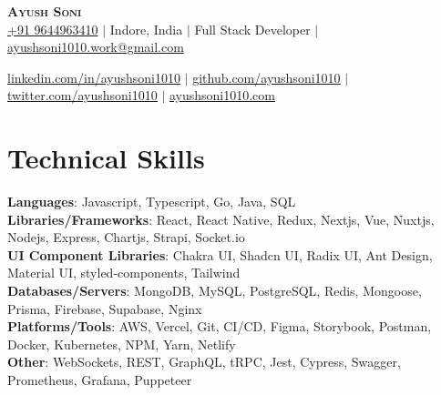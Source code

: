 \documentclass[letterpaper,11pt]{article}
\begin{document}

\begin{center}
  \textbf{\Huge \scshape Ayush Soni} \\ \vspace{10pt}
  \href{tel:9644963410}{+91 9644963410} $|$
  {Indore, India} $|$
  {Full Stack Developer} $|$
  \href{mailto:ayushsoni1010.work@gmail.com}{ayushsoni1010.work@gmail.com} \\ \vspace{3pt}

  \href{https://linkedin.com/in/ayushsoni1010}{\underline{linkedin.com/in/ayushsoni1010}} $|$
  \href{https://github.com/ayushsoni1010}{\underline{github.com/ayushsoni1010}} $|$
  \href{https://twitter.com/ayushsoni1010}{\underline{twitter.com/ayushsoni1010}} $|$
  \href{https://ayushsoni1010.com}{\underline{ayushsoni1010.com}}
\end{center}



\section{Technical Skills}
\begin{itemize}[leftmargin=0.15in, label={}]
  \small{\item{
        \textbf{Languages}{: \hfill Javascript, Typescript, Go, Java, SQL } \\
        \vspace{3pt}\textbf{Libraries/Frameworks}{: \hfill React, React Native, Redux, Nextjs, Vue, Nuxtjs, Nodejs, Express, Chartjs, Strapi, Socket.io} \\
        \vspace{3pt}\textbf{UI Component Libraries}{: \hfill Chakra UI, Shadcn UI, Radix UI, Ant Design, Material UI, styled-components, Tailwind} \\
        \vspace{3pt}\textbf{Databases/Servers}{: \hfill MongoDB, MySQL, PostgreSQL, Redis, Mongoose, Prisma, Firebase, Supabase, Nginx} \\
        \vspace{3pt}\textbf{Platforms/Tools}{: \hfill AWS, Vercel, Git, CI/CD, Figma, Storybook, Postman, Docker, Kubernetes, NPM, Yarn, Netlify } \\
        \vspace{3pt}\textbf{Other}{: \hfill WebSockets, REST, GraphQL, tRPC, Jest, Cypress, Swagger, Prometheus, Grafana, Puppeteer }
        }}
\end{itemize}
\end{document}
